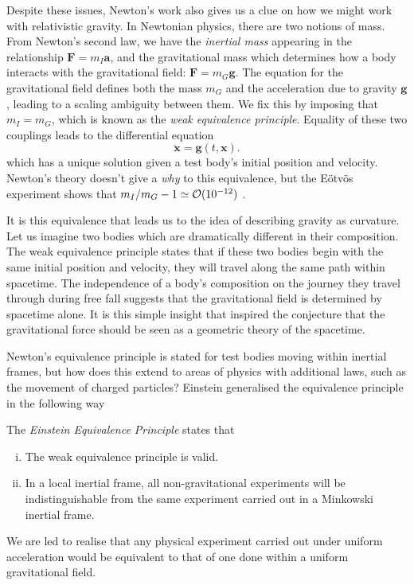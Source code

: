 Despite these issues, Newton's work also gives us a clue on how we might work with relativistic gravity. In Newtonian physics, there are two notions of mass. From Newton's second law, we have the \emph{inertial mass} appearing in the relationship $\mathbf{F} = m_I \mathbf{a}$, and the gravitational mass which determines how a body interacts with the gravitational field: $\mathbf{F} = m_G \mathbf{g}$. The equation for the gravitational field defines both the mass $m_G$ and the acceleration due to gravity $\mathbf{g}$, leading to a scaling ambiguity between them. We fix this by imposing that $m_I = m_G$, which is known as the \emph{weak equivalence principle}. Equality of these two couplings leads to the differential equation
\begin{equation*}
  \ddot{\mathbf{x}} = \mathbf{g}(t,\mathbf{x}).
\end{equation*}
which has a unique solution given a test body's initial position and velocity. Newton's theory doesn't give a \emph{why} to this equivalence, but the Eötvös experiment shows that $m_I / m_G - 1 \simeq {\cal O}(10^{-12})$ \cite{Braginsky1972}. 

It is this equivalence that leads us to the idea of describing gravity as curvature. Let us imagine two bodies which are dramatically different in their composition. The weak equivalence principle states that if these two bodies begin with the same initial position and velocity, they will travel along the same path within spacetime. The independence of a body's composition on the journey they travel through during free fall suggests that the gravitational field is determined by spacetime alone. It is this simple insight that inspired the conjecture that the gravitational force should be seen as a geometric theory of the spacetime.

Newton's equivalence principle is stated for test bodies moving within inertial frames, but how does this extend to areas of physics with additional laws, such as the movement of charged particles? Einstein generalised the equivalence principle in the following way
\begin{defn}
	The \emph{Einstein Equivalence Principle} states that
	\begin{enumerate}[(i)]
		\item The weak equivalence principle is valid.
		\item In a local inertial frame, all non-gravitational experiments will be indistinguishable from the same experiment carried out in a Minkowski inertial frame.
	\end{enumerate}
\end{defn}
We are led to realise that any physical experiment carried out under uniform acceleration would be equivalent to that of one done within a uniform gravitational field. 

